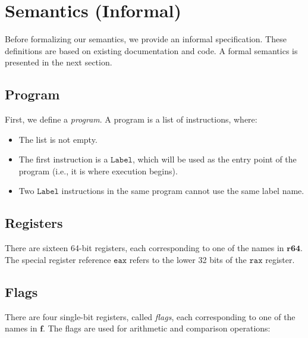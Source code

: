 \documentclass{article}
\newcommand{\nonterm}[1]{\ensuremath{\mathbf{#1}}}
\newcommand{\term}[1]{\ensuremath{\mathtt{#1}}}
\begin{document}
\section{Semantics (Informal)}

Before formalizing our semantics, we provide an informal specification. These
definitions are based on existing documentation and code. A formal semantics is
presented in the next section.

\subsection{Program}

First, we define a \emph{program}. A program is a list of instructions, where:

\begin{itemize}
\item The list is not empty.
\item The first instruction is a \term{Label}, which will be used as the entry
  point of the program (i.e., it is where execution begins).
\item Two \term{Label} instructions in the same program cannot use the same
  label name.
\end{itemize}

\subsection{Registers}

There are sixteen 64-bit registers, each corresponding to one of the names in
\nonterm{r64}. The special register reference \term{eax} refers to the lower 32
bits of the \term{rax} register.

\subsection{Flags}

There are four single-bit registers, called \emph{flags}, each corresponding to
one of the names in \nonterm{f}. The flags are used for arithmetic and
comparison operations:
\end{document}
